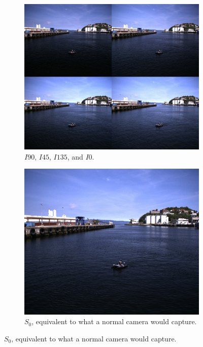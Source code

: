 \begin{figure}[H]
    \begin{subfigure}[T]{.49\textwidth}
        \includegraphics[width=\textwidth]{figures/img_0080_right_inten.jpg}
        \caption{$I90$, $I45$, $I135$, and $I0$.}
    \end{subfigure}
    \hfill
    \begin{subfigure}[T]{.49\textwidth}
        \includegraphics[width=\textwidth]{figures/img_0080_right_s0.jpg}
        \caption{$S_0$, equivalent to what a normal camera would capture.}
    \end{subfigure}
\end{figure}

